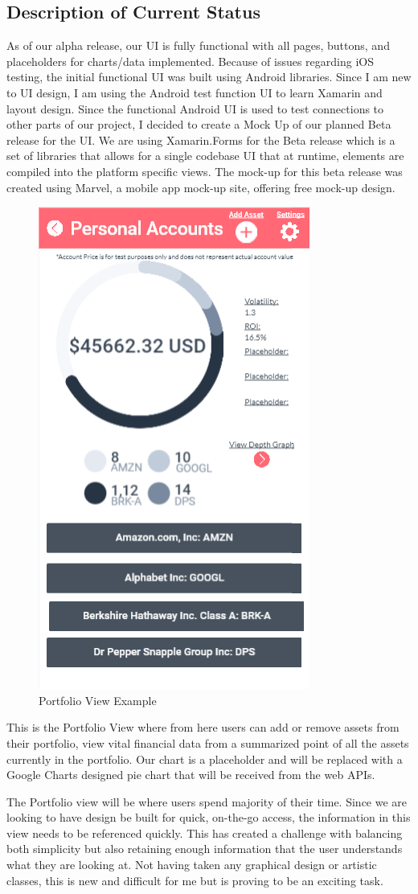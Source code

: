 \documentclass[letterpaper,10pt,titlepage,journal,compsoc,draftclsnofoot,onecolumn]{IEEEtran}
\begin{document}
\subsection{Description of Current Status}
As of our alpha release, our UI is fully functional with all pages, buttons, and placeholders for charts/data implemented. Because of issues regarding iOS testing, the initial functional UI was built using Android libraries. Since I am new to UI design, I am using the Android test function UI to learn Xamarin and layout design. Since the functional Android UI is used to test connections to other parts of our project, I decided to create a Mock Up of our planned Beta release for the UI. We are using Xamarin.Forms for the Beta release which is a set of libraries that allows for a single codebase UI that at runtime, elements are compiled into the platform specific views. The mock-up for this beta release was created using Marvel, a mobile app mock-up site, offering free mock-up design.

\begin{figure}
   \caption{Portfolio View Example}
   \begin{center}
   \includegraphics[width=.25\textwidth]{portfolio_screenshot}
\end{center}
\end{figure}
This is the Portfolio View where from here users can add or remove assets from their portfolio, view vital financial data from a summarized point of all the assets currently in the portfolio. Our chart is a placeholder and will be replaced with a Google Charts designed pie chart that will be received from the web APIs.  


The Portfolio view will be where users spend majority of their time. Since we are looking to have design be built for quick, on-the-go access, the information in this view needs to be referenced quickly. This has created a challenge with balancing both simplicity but also retaining enough information that the user understands what they are looking at. Not having taken any graphical design or artistic classes, this is new and difficult for me but is proving to be an exciting task.
\end{document}
